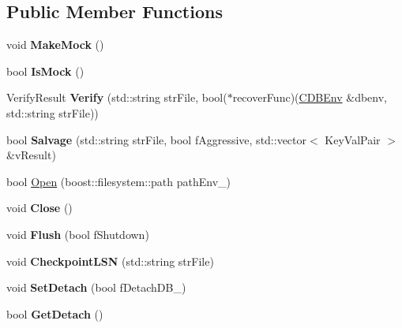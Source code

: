 \subsection*{Public Member Functions}
\begin{DoxyCompactItemize}
\item 
\mbox{\label{class_c_d_b_env_ab352b9f28a8329037fd942f9912797e3}} 
void {\bfseries Make\+Mock} ()
\item 
\mbox{\label{class_c_d_b_env_ae44129114301a41635c3707c6bc92ab1}} 
bool {\bfseries Is\+Mock} ()
\item 
\mbox{\label{class_c_d_b_env_a9d04604da4ad6f063e150b34d5df392d}} 
Verify\+Result {\bfseries Verify} (std\+::string str\+File, bool($\ast$recover\+Func)(\mbox{\hyperlink{class_c_d_b_env}{C\+D\+B\+Env}} \&dbenv, std\+::string str\+File))
\item 
\mbox{\label{class_c_d_b_env_a08726637bff0809ab9c7c493383a3914}} 
bool {\bfseries Salvage} (std\+::string str\+File, bool f\+Aggressive, std\+::vector$<$ Key\+Val\+Pair $>$ \&v\+Result)
\item 
bool \mbox{\hyperlink{class_c_d_b_env_a1a81be1585305e5cedd2bccd6c7570c3}{Open}} (boost\+::filesystem\+::path path\+Env\+\_\+)
\item 
\mbox{\label{class_c_d_b_env_a0bf3b64c05bf0d7f0a7dbaa9a072c0bc}} 
void {\bfseries Close} ()
\item 
\mbox{\label{class_c_d_b_env_a09c5850b88919553a8db416ce288ff1a}} 
void {\bfseries Flush} (bool f\+Shutdown)
\item 
\mbox{\label{class_c_d_b_env_aaf4c0dd43825ee2441eaa4177bef137b}} 
void {\bfseries Checkpoint\+L\+SN} (std\+::string str\+File)
\item 
\mbox{\label{class_c_d_b_env_a647e9fc3c58a5388f1492b62ee3977d1}} 
void {\bfseries Set\+Detach} (bool f\+Detach\+D\+B\+\_\+)
\item 
\mbox{\label{class_c_d_b_env_a98349e48ca20f347aef9033677690d0e}} 
bool {\bfseries Get\+Detach} ()
\item 

\end{DoxyCompactItemize}
